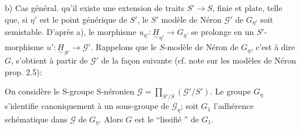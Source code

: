 b) Cas général.
qu'il existe une extension de traits $S'\longrightarrow S$, finie et plate, telle que, si $\eta'$ est le point générique de $S'$, le $S'$ modèle de Néron $\mathcal G'$ de $G_{\eta'}$ soit semi\inserted{-}stable. D'après a), le morphisme $u_{\eta'}:\underset{\sim}{H}_{\eta'}\longrightarrow G_{\eta'}$ se prolonge en un $S'$-morphisme $u':\underset{\sim}{H}_{S'}\longrightarrow\mathcal G'$. Rappelons que le $S$-modèle de Néron de $G_\eta$, c'est à dire $G$, s'obtient à partir de $\mathcal G'$ de la façon suivante (cf. note sur les modèles de Néron prop. 2.5):

On considère le S-groupe S-néronien $\mathcal G=\prod_{S'/S}(\mathcal G'/S')$. Le groupe $G_\eta$ s'identifie canoniquement à un sous-groupe de $\mathcal G_\eta$; soit $G_1$ l'adhérence schématique dans $\mathcal G$ de $G_\eta$. Alors $G$ est le ``lissifié '' de $G_1$.

